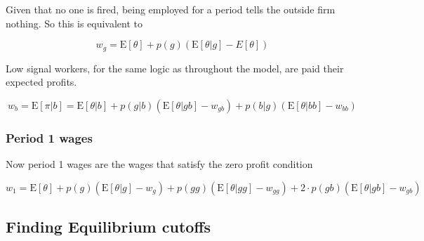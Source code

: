 \documentclass[11pt]{article}
\newcommand{\E}{\mathrm{E}}
\begin{document}
Given that no one is fired, being employed for a period tells the outside firm nothing. So this is equivalent to 

$$ w_g = \E[\theta] + p(g)(\E[\theta|g] - E[\theta]) $$

Low signal workers, for the same logic as throughout the model, are paid their expected profits. 

$$ w_b = \E[\pi|b] = \E[\theta|b] + p(g|b)(\E[\theta|gb] - w_{gb}) + p(b|g)(\E[\theta|bb] - w_{bb})$$


\subsubsection{Period 1 wages }

Now period 1 wages are the wages that satisfy the zero profit condition 

$$w_1 = \E[\theta] + p(g) (\E[\theta|g] - w_g) + p(gg)(\E[\theta|gg] - w_{gg}) + 2\cdot p(gb)(\E[\theta|gb] - w_{gb})$$


\subsection{Finding Equilibrium cutoffs}





	
\end{document}
